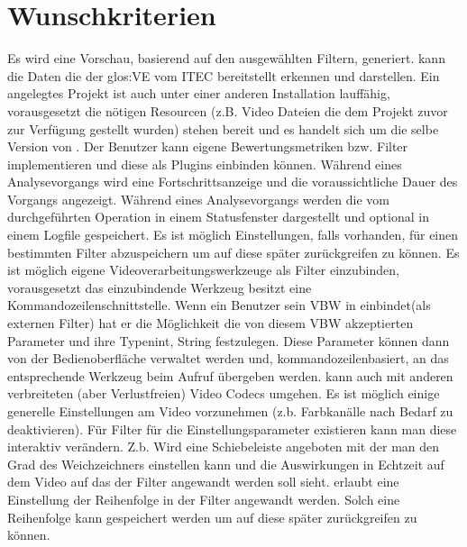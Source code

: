 \section{Wunschkriterien}
\setcounter{counterKriterien}{0}
 Es wird eine Vorschau, basierend auf den ausgewählten Filtern, generiert.
 \projektTitel kann die Daten die der \gls{glos:VE} vom \gls{ITEC}  bereitstellt erkennen und darstellen.
 Ein angelegtes Projekt ist auch unter einer anderen \projektTitel Installation lauffähig, vorausgesetzt die nötigen Resourcen (z.B. Video Dateien die dem Projekt zuvor zur Verfügung gestellt wurden)  stehen bereit und es handelt sich um die selbe Version von \projektTitel.
 Der Benutzer kann eigene Bewertungsmetriken bzw. Filter implementieren und diese als Plugins einbinden können.
 Während eines Analysevorgangs wird eine Fortschrittsanzeige und die voraussichtliche Dauer des Vorgangs angezeigt.
	Während eines Analysevorgangs werden die vom \projektTitel durchgeführten Operation in einem Statusfenster dargestellt und optional in einem Logfile gespeichert.
 Es ist möglich Einstellungen, falls vorhanden, für einen bestimmten Filter abzuspeichern um auf diese später zurückgreifen zu können.
 Es ist möglich eigene Videoverarbeitungswerkzeuge als Filter einzubinden, vorausgesetzt das einzubindende Werkzeug besitzt eine Kommandozeilenschnittstelle.
 Wenn ein Benutzer sein \gls{VBW} in \projektTitel einbindet(als externen Filter) hat er die
			Möglichkeit die von diesem \gls{VBW} akzeptierten Parameter und ihre Typen{int, String}
			festzulegen. Diese Parameter können dann von der Bedienoberfläche verwaltet werden und, 
			kommandozeilenbasiert, an das entsprechende Werkzeug beim Aufruf übergeben werden.
 \projektTitel kann auch mit anderen verbreiteten (aber Verlustfreien) Video Codecs umgehen.			
	Es ist möglich einige generelle Einstellungen am Video vorzunehmen (z.b. Farbkanälle 
			nach Bedarf zu deaktivieren).
 Für Filter für die Einstellungsparameter existieren kann man diese interaktiv verändern. Z.b. Wird eine Schiebeleiste angeboten mit der man den Grad des Weichzeichners einstellen kann und die Auswirkungen in Echtzeit auf dem Video auf das der Filter angewandt werden soll sieht.
 \projektTitel erlaubt eine Einstellung der Reihenfolge in der Filter angewandt werden. Solch
			eine Reihenfolge kann gespeichert werden um auf diese später zurückgreifen zu können.
